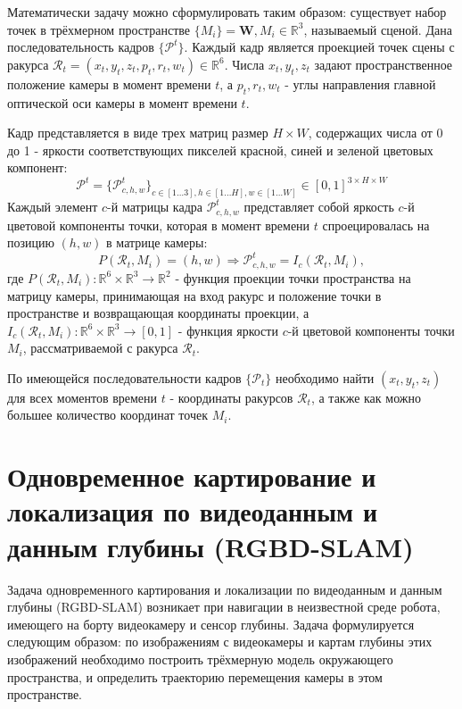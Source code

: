 \documentclass{mipt-thesis-bs}
\begin{document}
Математически задачу можно сформулировать таким образом: существует набор точек в трёхмерном пространстве $\{M_i \} = \textbf{W}, M_i \in \mathbb{R}^3$, называемый сценой. Дана последовательность кадров $\{\mathcal{P}^t\}$. Каждый кадр является проекцией точек сцены с ракурса $\mathcal{R}_t = (x_t, y_t, z_t, p_t, r_t, w_t) \in \mathbb{R}^6$. Числа $x_t, y_t, z_t$ задают пространственное положение камеры в момент времени $t$, а $p_t, r_t, w_t$ - углы направления главной оптической оси камеры в момент времени $t$.

Кадр представляется в виде трех матриц размер $H \times W$, содержащих числа от 0 до 1 - яркости соответствующих пикселей красной, синей и зеленой цветовых компонент:
$$\mathcal{P}^t = \{\mathcal{P}^t_{c,h,w}\}_{c \in [1 \dots 3], h \in [1 \dots H], w \in [1 \dots W]} \in [0, 1]^{3 \times H \times W}$$
Каждый элемент $c$-й матрицы кадра $\mathcal{P}^t_{c,h,w}$ представляет собой яркость $c$-й цветовой компоненты точки, которая в момент времени $t$ спроецировалась на позицию $(h, w)$ в матрице камеры:
$$P(\mathcal{R}_t, M_i) = (h, w) \Rightarrow \mathcal{P}^t_{c,h,w} = I_c(\mathcal{R}_t, M_i),$$
где $P(\mathcal{R}_t, M_i): \mathbb{R}^6 \times \mathbb{R}^3 \rightarrow \mathbb{R}^2$ - функция проекции точки пространства на матрицу камеры, принимающая на вход ракурс и положение точки в пространстве и возвращающая координаты проекции, а $I_c (\mathcal{R}_t, M_i): \mathbb{R}^6 \times \mathbb{R}^3 \rightarrow [0, 1]$ - функция яркости $c$-й цветовой компоненты точки $M_i$, рассматриваемой с ракурса $\mathcal{R}_t$.

По имеющейся последовательности кадров $\{\mathcal{P}_t\}$ необходимо найти $(x_t, y_t, z_t)$ для всех моментов времени $t$ - координаты ракурсов $\mathcal{R}_t$, а также как можно большее количество координат точек $M_i$.

\section{Одновременное картирование и локализация по видеоданным и данным глубины (RGBD-SLAM)}

Задача одновременного картирования и локализации по видеоданным и данным глубины (RGBD-SLAM) возникает при навигации в неизвестной среде робота, имеющего на борту видеокамеру и сенсор глубины. Задача формулируется следующим образом: по изображениям с видеокамеры и картам глубины этих изображений необходимо построить трёхмерную модель окружающего пространства, и определить траекторию перемещения камеры в этом пространстве.
\end{document}
